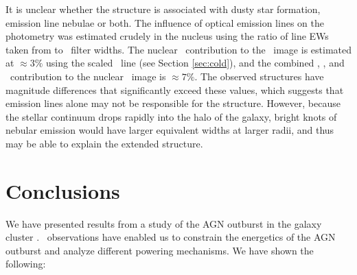 \documentclass[11pt, preprint]{aastex}
\begin{document}
It is unclear whether the structure is associated with dusty star
formation, emission line nebulae or both. The influence of optical
emission lines on the photometry was estimated crudely in the nucleus
using the ratio of line EWs taken from \citet{rbs1} to \hst\ filter
widths. The nuclear \halpha\ contribution to the \myi\ image is
estimated at $\approx 3\%$ using the scaled \hbeta\ line (see Section
\ref{sec:cold}), and the combined \hbeta, \oii, and
\oiii\ contribution to the nuclear \myv\ image is $\approx 7\%$. The
observed structures have magnitude differences that significantly
exceed these values, which suggests that emission lines alone may not
be responsible for the structure. However, because the stellar
continuum drops rapidly into the halo of the galaxy, bright knots of
nebular emission would have larger equivalent widths at larger radii,
and thus may be able to explain the extended structure.

\section{Conclusions}
\label{sec:con}

We have presented results from a study of the AGN outburst in the
galaxy cluster \rbs. \cxo\ observations have enabled us to constrain
the energetics of the AGN outburst and analyze different powering
mechanisms. We have shown the following:
\end{document}
